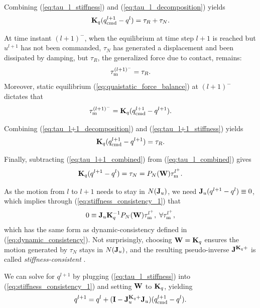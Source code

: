 Combining (\ref{eq:tau_l_stiffness}) and (\ref{eq:tau_l_decomposition}) yields
\begin{equation}
\label{eq:tau_l_combined}
\mb{K}_q(\qcmd[l+1] - q^l) = \tau_R +\tau_N.
\end{equation}

At time instant $(l+1)^-$, when the equilibrium at time step $l+1$ is reached but $u^{l+1}$ has not been commanded, $\tau_N$ has generated a displacement and been dissipated by damping, but $\tau_R$, the generalized force due to contact, remains:
\begin{equation}
\label{eq:tau_l+1_decomposition}
\tauM^{(l+1)^-} = \tau_R.
\end{equation}
Moreover, static equilibrium (\ref{eq:quaistatic_force_balance}) at $(l+1)^-$ dictates that 
\begin{equation}
\label{eq:tau_l+1_stiffness}
\tauM^{(l+1)^-} = \mb{K}_q(\qcmd[l+1] - q^{l+1}).
\end{equation}

Combining (\ref{eq:tau_l+1_decomposition}) and (\ref{eq:tau_l+1_stiffness}) yields 
\begin{equation}
\label{eq:tau_l+1_combined}
\mb{K}_q(\qcmd[l+1] - q^{l+1}) = \tau_R.
\end{equation}

Finally, subtracting (\ref{eq:tau_l+1_combined}) from (\ref{eq:tau_l_combined}) gives
\begin{equation}
\label{eq:stiffness_consistency_1}
\mb{K}_q(q^{l+1} - q^l) = \tau_N = P_N(\mb{W}) \tauM^{l^+}.
\end{equation}

As the motion from $l$ to $l+1$ needs to stay in $N(\mathbf{J}_u)$, we need $\mathbf{J}_u(q^{l+1} - q^l) \equiv 0$, which implies through (\ref{eq:stiffness_consistency_1}) that
\begin{equation}
0 \equiv \mathbf{J}_u \mathbf{K}_q^{-1}P_N(\mathbf{W}) \tau_{\text{m}}^{l^+}, \; \forall \tau_{\text{m}}^{l^+},
\end{equation}
which has the same form as dynamic-consistency defined in (\ref{eq:dynamic_consistency}). Not surprisingly, choosing $\mathbf{W} = \mathbf{K}_q$ ensures the motion generated by $\tau_N$ stays in $N(\mathbf{J}_u)$, and the resulting pseudo-inverse $\mathbf{J}^{\mathbf{K}_q+}$ is called \textit{stiffness-consistent} \cite{dietrich2015overview}.

We can solve for $q^{l+1}$ by plugging (\ref{eq:tau_l_stiffness}) into (\ref{eq:stiffness_consistency_1}) and setting $\mathbf{W}$ to $\mathbf{K}_q$, yielding
\begin{equation}
\label{eq:state_null_space_projection}
q^{l+1} = q^l + (\mb{I} - \J_u^{\mb{K}_q+}\J_u) (\qcmd[l+1] - q^l).
\end{equation}

